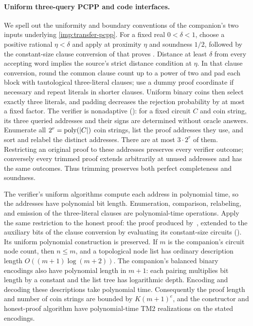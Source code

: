 \paragraph{Uniform three-query PCPP and code interfaces.}
We spell out the uniformity and boundary conventions of the
companion's two inputs underlying \cref{imp:transfer-pcpp}.
For a fixed real \(0<\delta<1\), choose a positive rational
\(\eta<\delta\) and apply \cite[Lemma~22]{CW19} at proximity
\(\eta\) and soundness \(1/2\), followed by the constant-size clause
conversion of \cite[Appendix~A]{CW19} that proves
\cite[Lemma~24]{CW19}. Distance at least \(\delta\) from every
accepting word implies the source's strict distance condition at
\(\eta\). In that clause conversion,
round the common clause count up to a power of two and pad each
block with tautological three-literal clauses; use a dummy proof
coordinate if necessary and repeat literals in shorter clauses.
Uniform binary coins then select exactly three literals, and
padding decreases the rejection probability by at most a fixed
factor. The verifier is nonadaptive
(\cite[Definition~20]{CW19}):
for a fixed circuit \(C\) and coin string, its three queried
addresses and their signs are determined without oracle answers.
Enumerate all \(2^r=\operatorname{poly}(|C|)\) coin strings, list the proof
addresses they use, and sort and relabel the distinct addresses.
There are at most \(3\cdot2^r\) of them. Restricting an original
proof to these addresses preserves every verifier outcome;
conversely every trimmed proof extends arbitrarily at unused
addresses and has the same outcomes. Thus trimming preserves
both perfect completeness and soundness.

The verifier's uniform algorithms compute each address in
polynomial time, so the addresses have polynomial bit length.
Enumeration, comparison, relabeling, and emission of the
three-literal clauses are polynomial-time operations. Apply the
same restriction to the honest proof: the proof produced
by~\cite[Lemma~22]{CW19}, extended to the auxiliary bits of the
clause conversion by evaluating its constant-size circuits
(\cite[Appendix~A]{CW19}). Its uniform polynomial construction is
preserved. If \(m\) is the companion's circuit
node count, then \(n\le m\), and a topological node list has
ordinary description length \(O((m+1)\log(m+2))\).
The companion's balanced binary encodings also have polynomial
length in \(m+1\): each pairing multiplies bit length by a
constant and the list tree has logarithmic depth. Encoding and
decoding these descriptions take polynomial time. Consequently
the proof length and number of coin strings are bounded by
\(K(m+1)^e\), and the constructor and honest-proof algorithm
have polynomial-time TM2 realizations on the stated encodings.

